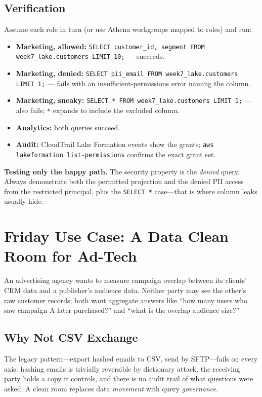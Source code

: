 \subsection*{Verification}
Assume each role in turn (or use Athena workgroups mapped to roles) and run:
\begin{itemize}
    \item \textbf{Marketing, allowed:} \texttt{SELECT customer\_id, segment FROM week7\_lake.customers LIMIT 10;} --- succeeds.
    \item \textbf{Marketing, denied:} \texttt{SELECT pii\_email FROM week7\_lake.customers LIMIT 1;} --- fails with an insufficient-permissions error naming the column.
    \item \textbf{Marketing, sneaky:} \texttt{SELECT * FROM week7\_lake.customers LIMIT 1;} --- also fails; \texttt{*} expands to include the excluded column.
    \item \textbf{Analytics:} both queries succeed.
    \item \textbf{Audit:} CloudTrail Lake Formation events show the grants; \texttt{aws lakeformation list-permissions} confirms the exact grant set.
\end{itemize}

\begin{pitfall}
\textbf{Testing only the happy path.} The security property is the \emph{denied} query. Always demonstrate both the permitted projection and the denied PII access from the restricted principal, plus the \texttt{SELECT *} case---that is where column leaks usually hide.
\end{pitfall}

\section{Friday Use Case: A Data Clean Room for Ad-Tech}
An advertising agency wants to measure campaign overlap between its clients' CRM data and a publisher's audience data. Neither party may see the other's raw customer records; both want aggregate answers like ``how many users who saw campaign A later purchased?'' and ``what is the overlap audience size?''

\subsection{Why Not CSV Exchange}
The legacy pattern---export hashed emails to CSV, send by SFTP---fails on every axis: hashing emails is trivially reversible by dictionary attack, the receiving party holds a copy it controls, and there is no audit trail of what questions were asked. A clean room replaces data \emph{movement} with query \emph{governance}.

